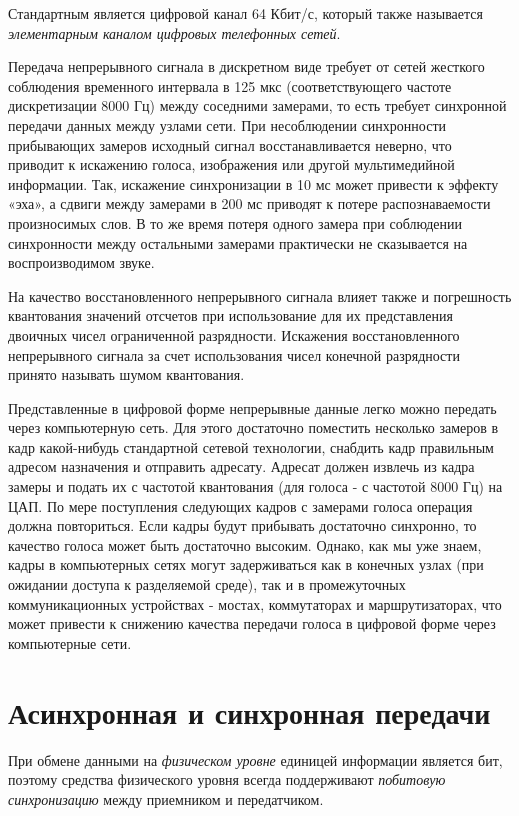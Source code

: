 Стандартным является цифровой канал 64 Кбит/с, который также называется \emph{элементарным каналом цифровых телефонных сетей}.

Передача непрерывного сигнала в дискретном виде требует от сетей жесткого соблюдения временного интервала в 125 мкс (соответствующего частоте дискретизации 8000 Гц) между соседними замерами, то есть требует синхронной передачи данных между узлами сети.
При несоблюдении синхронности прибывающих замеров исходный сигнал восстанавливается неверно, что приводит к искажению голоса, изображения или другой мультимедийной информации.
Так, искажение синхронизации в 10 мс может привести к эффекту «эха», а сдвиги между замерами в 200 мс приводят к потере распознаваемости произносимых слов.
В то же время потеря одного замера при соблюдении синхронности между остальными замерами практически не сказывается на воспроизводимом звуке.

На качество восстановленного непрерывного сигнала влияет также и погрешность квантования значений отсчетов при использование для их представления двоичных чисел ограниченной разрядности.
Искажения восстановленного непрерывного сигнала за счет использования чисел конечной разрядности принято называть шумом квантования.

Представленные в цифровой форме непрерывные данные легко можно передать через компьютерную сеть.
Для этого достаточно поместить несколько замеров в кадр какой-нибудь стандартной сетевой технологии, снабдить кадр правильным адресом назначения и отправить адресату.
Адресат должен извлечь из кадра замеры и подать их с частотой квантования (для голоса - с частотой 8000 Гц) на ЦАП.
По мере поступления следующих кадров с замерами голоса операция должна повториться.
Если кадры будут прибывать достаточно синхронно, то качество голоса может быть достаточно высоким.
Однако, как мы уже знаем, кадры в компьютерных сетях могут задерживаться как в конечных узлах (при ожидании доступа к разделяемой среде), так и в промежуточных коммуникационных устройствах - мостах, коммутаторах и маршрутизаторах, что может привести к снижению качества передачи голоса в цифровой форме через компьютерные сети.

\section{Асинхронная и синхронная передачи}

При обмене данными на \emph{физическом уровне} единицей информации является бит, поэтому средства физического уровня всегда поддерживают \emph{побитовую синхронизацию} между приемником и передатчиком.

